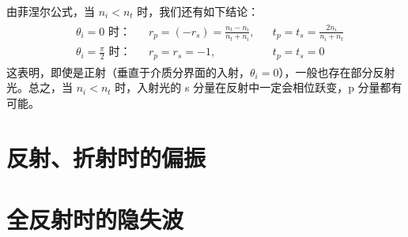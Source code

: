 \documentclass[UTF8]{report}
\theoremstyle{MyLineTheoremStyle} %
\theoremstyle{MyBlockTheoremStyle} %
\theoremstyle{MySubsubsectionStyle} %
\begin{document}
由菲涅尔公式，当 $n_i < n_t$ 时，我们还有如下结论：
\begin{gather}
    \begin{aligned}
        &\text{$\theta_i = 0$ 时：} &&r_p = (-r_s)  = \frac{n_t - n_i}{n_t + n_i}, &&t_p = t_s = \frac{2n_i}{n_i + n_t} \\ 
        &\text{$\theta_i = \frac{\pi}{2}$ 时：} &&r_p = r_s  = -1,&&t_p = t_s  =0
    \end{aligned}
\end{gather}
这表明，即使是正射（垂直于介质分界面的入射，$\theta_i = 0$），一般也存在部分反射光。总之，当 $n_i < n_t$ 时，入射光的 s 分量在反射中一定会相位跃变，p 分量都有可能。



\section{反射、折射时的偏振}



\section{全反射时的隐失波}
\end{document}
